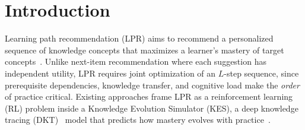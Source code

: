 \documentclass[sigconf,anonymous]{acmart}
\begin{document}


\maketitle

\section{Introduction}

Learning path recommendation (LPR) aims to recommend a personalized sequence of knowledge concepts that maximizes a learner's mastery of target concepts~\cite{liu2019cseal,li2023gehrl,cheng2025knowlp}. Unlike next-item recommendation where each suggestion has independent utility, LPR requires joint optimization of an $L$-step sequence, since prerequisite dependencies, knowledge transfer, and cognitive load make the \emph{order} of practice critical. Existing approaches frame LPR as a reinforcement learning (RL) problem inside a Knowledge Evolution Simulator (KES), a deep knowledge tracing (DKT)~\cite{piech2015dkt} model that predicts how mastery evolves with practice~\cite{liu2019cseal,chen2023src,li2023gehrl,cheng2025knowlp}.
\end{document}
